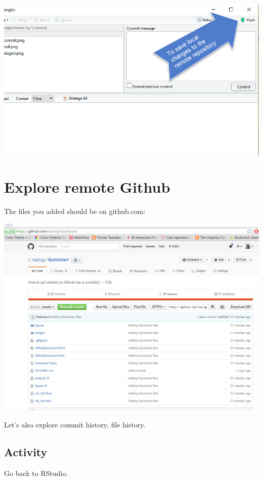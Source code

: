 \documentclass[]{book}
\begin{document}
\includegraphics{img/push.png}

\hypertarget{explore-remote-github}{%
\section{Explore remote Github}\label{explore-remote-github}}

The files you added should be on github.com:

\includegraphics{img/Github_remote.png}

Let's also explore commit history, file history.

\hypertarget{activity-2}{%
\subsection{Activity}\label{activity-2}}

Go back to RStudio.
\end{document}
